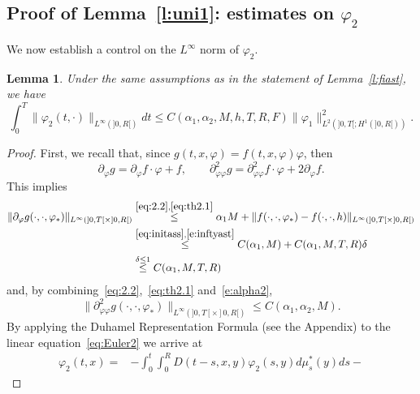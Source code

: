 \documentclass[11pt,leqno]{amsart}
\newtheorem{lemma}[theorem]{Lemma}
\numberwithin{equation}{section}
\begin{document}
\subsection{Proof of Lemma~\ref{l:uni1}: estimates on ${\varphi}_2$}
\label{ss:fhidue}
We now establish a control on the $L^\infty$ norm of ${\varphi}_2$.
\begin{lemma}
\label{l:intfhi2}
Under the same assumptions as in the statement of Lemma~\ref{l:fiast}, we have 
\begin{equation}
  \label{e:intfhi2}
  \int_0^T \| {\varphi}_2(t, \cdot) \|_{L^\infty(]0, R[)} dt \leq
  C (\alpha_1, \alpha_2, M, h, T, R, F)
  \| {\varphi}_1 \|^2_{L^2(]0, T[ ; H^1(]0, R[ ))}.
\end{equation}
\end{lemma}
\begin{proof}
First, we recall that, since $g (t, x, {\varphi}) = f(t, x, {\varphi}) {\varphi}$, then 
$$
    {\partial}_{\varphi} g = {\partial}_{\varphi} f \cdot {\varphi} + f, \qquad 
    {\partial}^2_{{\varphi} {\varphi}} g =  {\partial}^2_{{\varphi} {\varphi}} f \cdot {\varphi}+ 2 {\partial}_{\varphi} f. 
$$
This implies  
\begin{equation}
\label{e:bounduniformi1}
\begin{split}
    \|  {\partial}_{\varphi} g (\cdot, \cdot, {\varphi}_\ast) \|_{L^\infty (]0, T[ \times ]0, R[)}
    & \stackrel{\eqref{eq:2.2},\eqref{eq:th2.1}}{\leq}
    \alpha_1 M + \| f (\cdot, \cdot, {\varphi}_\ast) - 
    f (\cdot, \cdot, h) \|_{L^\infty (]0, T[ \times ]0, R[)} \\
    & 
    \stackrel{\eqref{eq:initass},\eqref{e:inftyast}}{\leq}
    C(\alpha_1, M) + C(\alpha_1, M, T, R) \delta \\
    &
    \stackrel{\delta \leq 1}{\leq} C(\alpha_1, M, T, R)
     \end{split} 
\end{equation}
and, by combining~\eqref{eq:2.2},~\eqref{eq:th2.1} and~\eqref{e:alpha2},  
\begin{equation}
\label{e:bounduniformi2}
 \|  {\partial}^2_{{\varphi} {\varphi}} g (\cdot, \cdot, {\varphi}_\ast) \|_{L^\infty (]0, T[ \times ]0, R[)}
 \leq C(\alpha_1, \alpha_2, M). 
\end{equation}
 By applying the Duhamel Representation Formula (see the Appendix) to the linear equation~\eqref{eq:Euler2} we arrive at  
\begin{equation*}
\begin{split}   
    {\varphi}_2 (t, x)  = & - 
    \int_0^t  \! \! \int_0^R \! \! \! D(t-s, x, y) {\varphi}_2 (s, y) d \mu^\ast_s (y) ds -

\end{split}
\end{equation*}
\end{proof}
\end{document}
